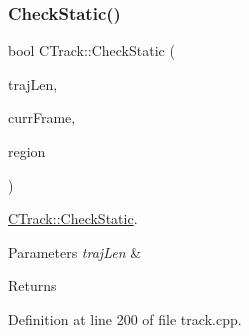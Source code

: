 \subsubsection{\texorpdfstring{Check\+Static()}{CheckStatic()}}
{\footnotesize\ttfamily bool C\+Track\+::\+Check\+Static (\begin{DoxyParamCaption}\item[{int}]{traj\+Len,  }\item[{cv\+::\+U\+Mat}]{curr\+Frame,  }\item[{const \mbox{\hyperlink{class_c_region}{C\+Region}} \&}]{region }\end{DoxyParamCaption})\hspace{0.3cm}{\ttfamily [private]}}



\mbox{\hyperlink{class_c_track_ab16e6724f0e9d22301d46efda587f567}{C\+Track\+::\+Check\+Static}}. 


\begin{DoxyParams}{Parameters}
{\em traj\+Len} & \\
\hline
\end{DoxyParams}
\begin{DoxyReturn}{Returns}

\end{DoxyReturn}


Definition at line 200 of file track.\+cpp.



